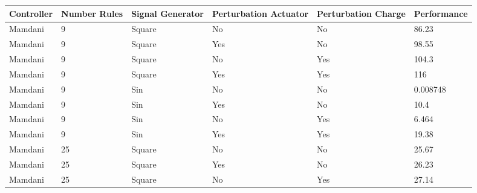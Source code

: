 \documentclass{article}
\begin{document}
\begin{table}[h]
\begin{adjustwidth}{-1cm}{}
\begin{tabular}{|p{1.7cm}|p{2.55cm}|p{3cm}|p{2.5cm}|p{2.5cm}|p{2.2cm}|}
\hline
\textbf{Controller} & \textbf{Number Rules} & \textbf{Signal Generator} & \textbf{Perturbation Actuator} & \textbf{Perturbation Charge} & \textbf{Performance} \\ \hline
Mamdani             & 9                     & Square                    & No                             & No                           & 86.23                \\
Mamdani             & 9                     & Square                    & Yes                            & No                           & 98.55                \\
Mamdani             & 9                     & Square                    & No                             & Yes                          & 104.3                \\
Mamdani             & 9                     & Square                    & Yes                            & Yes                          & 116                  \\
Mamdani             & 9                     & Sin                       & No                             & No                           & 0.008748             \\
Mamdani             & 9                     & Sin                       & Yes                            & No                           & 10.4                 \\
Mamdani             & 9                     & Sin                       & No                             & Yes                          & 6.464                \\
Mamdani             & 9                     & Sin                       & Yes                            & Yes                          & 19.38                \\
Mamdani             & 25                    & Square                    & No                             & No                           & 25.67                \\
Mamdani             & 25                    & Square                    & Yes                            & No                           & 26.23                \\
Mamdani             & 25                    & Square                    & No                             & Yes                          & 27.14                \\

\end{tabular}
\end{adjustwidth}
\end{table}
\end{document}
